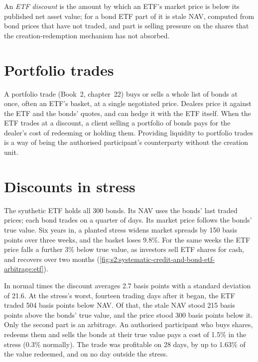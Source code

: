 \begin{definition}\label{def:s2:systematic-credit-and-bond-etf-arbitrage:discount}
An \emph{ETF discount} is the amount by which an ETF's market price is below its published net asset value; for a bond ETF part of
it is stale NAV, computed from bond prices that have not traded, and part is selling pressure on the shares that the creation-redemption mechanism has
not absorbed.
\end{definition}

\section{Portfolio trades}

A portfolio trade (Book~2, chapter~22) buys or sells a whole list of bonds at once, often an ETF's basket, at a single negotiated price. Dealers price
it against the ETF and the bonds' quotes, and can hedge it with the ETF itself. When the ETF trades at a discount, a client selling a portfolio of
bonds pays for the dealer's cost of redeeming or holding them. Providing liquidity to portfolio trades is a way of being the authorised
participant's counterparty without the creation unit.

\section{Discounts in stress}

The synthetic ETF holds all 300 bonds. Its NAV uses the bonds' last traded prices; each bond trades on a quarter of days. Its market price follows the
bonds' true value. Six years in, a planted stress widens market spreads by 150 basis points over three weeks, and the basket loses 9.8\%. For the same
weeks the ETF price falls a further 3\% below true value, as investors sell ETF shares for cash, and recovers over two months
(\cref{fig:s2:systematic-credit-and-bond-etf-arbitrage:etf}).

In normal times the discount averages 2.7 basis points with a standard deviation of 21.6. At the stress's worst, fourteen trading days after it began, the ETF traded
504 basis points below NAV. Of that, the stale NAV stood 215 basis points above the bonds' true value, and the price stood 300 basis points below it.
Only the second part is an arbitrage. An authorised participant who buys shares, redeems them and sells the bonds at their true value pays a cost of
1.5\% in the stress (0.3\% normally). The trade was profitable on 28 days, by up to 1.63\% of the value redeemed, and on no day outside the stress.

